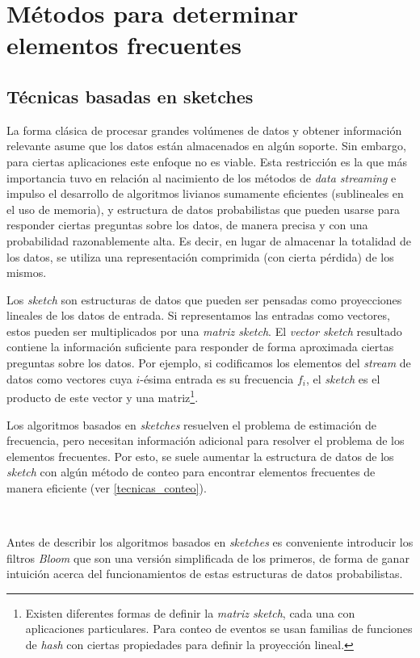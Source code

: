 \documentclass[a4paper,10pt, oneside]{article}
\begin{document}
\section{Métodos para determinar elementos frecuentes}

\subsection{Técnicas basadas en sketches}

La forma clásica de procesar grandes volúmenes de datos y obtener información relevante asume que los datos están almacenados en algún soporte. Sin embargo, para ciertas aplicaciones este enfoque no es viable. Esta restricción es la que más importancia tuvo en relación al nacimiento de los métodos de \textit{data streaming} e impulso el desarrollo de algoritmos livianos sumamente eficientes (sublineales en el uso de memoria), y estructura de datos probabilistas que pueden usarse para responder ciertas preguntas sobre los datos, de manera precisa y con una probabilidad razonablemente alta. Es decir, en lugar de almacenar la totalidad de los datos, se utiliza una representación comprimida (con cierta pérdida) de los mismos.

Los \textit{sketch} son estructuras de datos que pueden ser pensadas como proyecciones lineales de los datos de entrada. Si representamos las entradas como vectores, estos pueden ser multiplicados por una \textit{matriz sketch}. El \textit{vector sketch} resultado contiene la  información suficiente para responder de forma aproximada ciertas preguntas sobre los datos. Por ejemplo, si codificamos los elementos del \textit{stream} de datos como vectores cuya $i$-ésima entrada es su frecuencia $f_i$, el \textit{sketch} es el producto de este vector y una matriz\footnote{Existen diferentes formas de definir la \textit{matriz sketch}, cada una con aplicaciones particulares. Para conteo de eventos se usan familias de funciones de \textit{hash} con ciertas propiedades para definir la proyección lineal.}.

Los algoritmos basados en \textit{sketches} resuelven el problema de estimación de frecuencia, pero necesitan información adicional para resolver el problema de los elementos frecuentes. Por esto, se suele aumentar la estructura de datos de los \textit{sketch} con algún método de conteo para encontrar elementos frecuentes de manera eficiente (ver \ref{tecnicas_conteo}).

\

Antes de describir los algoritmos basados en \textit{sketches} es conveniente introducir los filtros \textit{Bloom} que son una versión simplificada de los primeros, de forma de ganar intuición acerca del funcionamientos de estas estructuras de datos probabilistas.
\end{document}
